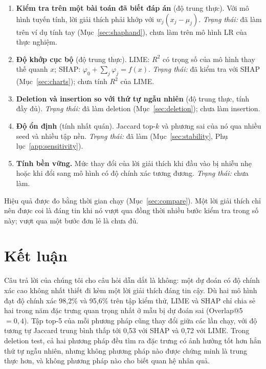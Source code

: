 \documentclass[11pt,a4paper]{article}
\begin{document}
\begin{enumerate}
  \item \textbf{Kiểm tra trên một bài toán đã biết đáp án} (độ trung thực).
        Với mô hình tuyến tính, lời giải thích phải khớp với
        $w_j (x_j - \mu_j)$. \emph{Trạng thái:} đã làm trên ví dụ tính tay
        (Mục~\ref{sec:shaphand}), chưa làm trên mô hình LR của thực nghiệm.
  \item \textbf{Độ khớp cục bộ} (độ trung thực). LIME: $R^2$ có trọng số của
        mô hình thay thế quanh $x$; SHAP: $\varphi_0 + \sum_j \varphi_j = f(x)$.
        \emph{Trạng thái:} đã kiểm tra với SHAP (Mục~\ref{sec:charts}); chưa
        tính $R^2$ của LIME.
  \item \textbf{Deletion và insertion so với thứ tự ngẫu nhiên} (độ trung
        thực, tính đầy đủ). \emph{Trạng thái:} đã làm deletion
        (Mục~\ref{sec:deletion}); chưa làm insertion.
  \item \textbf{Độ ổn định} (tính nhất quán). Jaccard top-$k$ và phương sai
        của nó qua nhiều seed và nhiều tập nền. \emph{Trạng thái:} đã làm
        (Mục~\ref{sec:stability}, Phụ lục~\ref{app:sensitivity}).
  \item \textbf{Tính bền vững.} Mức thay đổi của lời giải thích khi đầu vào bị
        nhiễu nhẹ hoặc khi đổi sang mô hình có độ chính xác tương đương.
        \emph{Trạng thái:} chưa làm.
\end{enumerate}

Hiệu quả được đo bằng thời gian chạy (Mục~\ref{sec:compare}). Một lời giải
thích chỉ nên được coi là đáng tin khi nó vượt qua đồng thời nhiều bước kiểm
tra trong số này; vượt qua một bước đơn lẻ là chưa đủ.

\section{Kết luận}
Câu trả lời của chúng tôi cho câu hỏi dẫn dắt là không: một dự đoán có độ
chính xác cao không nhất thiết đi kèm một lời giải thích đáng tin cậy. Dù hai
mô hình đạt độ chính xác 98,2\% và 95,6\% trên tập kiểm thử, LIME và SHAP chỉ
chia sẻ hai trong năm đặc trưng quan trọng nhất ở mẫu bị dự đoán sai
(Overlap@5 $= 0{,}4$). Tập top-5 của mỗi phương pháp cũng thay đổi giữa các
lần chạy, với độ tương tự Jaccard trung bình thấp tới 0,53 với SHAP và 0,72
với LIME. Trong deletion test, cả hai phương pháp đều tìm ra đặc trưng có ảnh
hưởng tốt hơn hẳn thứ tự ngẫu nhiên, nhưng không phương pháp nào được chứng
minh là trung thực hơn, và không phương pháp nào cho biết quan hệ nhân quả.
\end{document}
